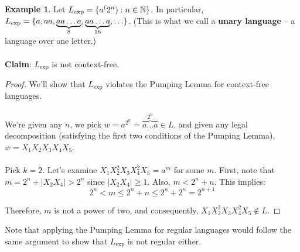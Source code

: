 \documentclass[]{article}
\DeclarePairedDelimiter{\set}{\lbrace}{\rbrace}
\theoremstyle{definition}
\newtheorem{ex}{Example}[section]
\newcommand{\lecture}[1]{\marginpar{{\footnotesize $\leftarrow$ \underline{#1}}}}
\begin{document}
      \begin{ex} \lecture{October 29, 2013}
        Let $L_\text{exp} = \set{a^(2^n) : n \in \mathbb{N} }$. In particular, $L_\text{exp} = \set{ a, aa, \underbrace{aa \ldots a}_8, \underbrace{aa \ldots a}_{16}, \ldots }$. (This is what we call a \textbf{unary language} -- a language over one letter.)
        \\ \\
        \textbf{Claim}: $L_\text{exp}$ is not context-free.

        \begin{proof}
          We'll show that $L_\text{exp}$ violates the Pumping Lemma for context-free languages.
          \\ \\
          We're given any $n$, we pick $w = a^{2^n} = \overbrace{a \ldots a}^{2^n} \in L$, and given any legal decomposition (satisfying the first two conditions of the Pumping Lemma), $w = X_1 X_2 X_3 X_4 X_5$.
          \\ \\
          Pick $k = 2$. Let's examine $X_1 X_2^2 X_3 X_4^2 X_5 = a^m$ for some $m$. First, note that $m = 2^n + |X_2 X_4| > 2^n$ since $|X_2 X_4| \ge 1$. Also, $m < 2^n + n$. This implies:
          $$
            2^n < m \le 2^n + n \le 2^n + 2^n = 2^{n + 1}
          $$

          Therefore, $m$ is not a power of two, and consequently, $X_1 X_2^2 X_3 X_4^2 X_5 \not \in L$.
        \end{proof}

        Note that applying the Pumping Lemma for regular languages would follow the same argument to show that $L_\text{exp}$ is not regular either.
      \end{ex}
\end{document}
